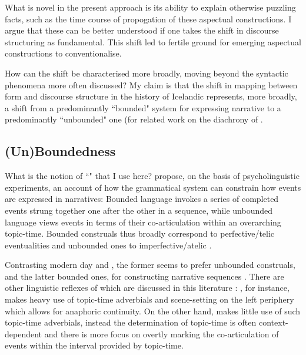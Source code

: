 \documentclass[output=paper,colorlinks,citecolor=brown]{langscibook}
\begin{document}
What is novel in the present approach is its ability to explain otherwise puzzling facts, such as the time course of propogation of these aspectual constructions. I argue that these can be better understood if one takes the shift in discourse structuring as fundamental. This shift led to fertile ground for emerging aspectual constructions to conventionalise. 

How can the shift be characterised more broadly, moving beyond the syntactic phenomena more often discussed? My claim is that the shift in mapping between form and discourse structure in the history of Icelandic represents, more broadly, a shift from a predominantly ``bounded" system for expressing narrative to a predominantly ``unbounded" one (for related work on the diachrony of  \citep{petre2010functions, petre2014constructions, los2012, fanego2024english}.

\subsection{(Un)Boundedness}\label{sec:Chark4.2}
What is the notion of ``" that I use here? \citet{von2012grammaticized, von2002cross} propose, on the basis of psycholinguistic experiments, an account of how the grammatical system can constrain how events are expressed in narratives: Bounded  language invokes a series of completed events strung together one after the other in a sequence, while unbounded language views events in terms of their co-articulation within an overarching topic-time. Bounded  construals thus broadly correspond to perfective/telic eventualities and unbounded ones to imperfective/atelic \citep{kupersmitt2015moving}. 

Contrasting modern day  and , the former seems to prefer unbounded construals, and the latter bounded ones, for constructing narrative sequences \citep{vonstutterheim2005crosslinguistic, berman2013relating}. There are other linguistic reflexes of  which are discussed in this literature \citep{vonstutterheim2005crosslinguistic, kupersmitt2015moving}: , for instance, makes heavy use of topic-time adverbials and scene-setting on the left periphery which allows for anaphoric continuity. On the other hand,  makes little use of such topic-time adverbials, instead the determination of topic-time is often context-dependent and there is more focus on overtly marking the co-articulation of events within the interval provided by topic-time.
\end{document}
